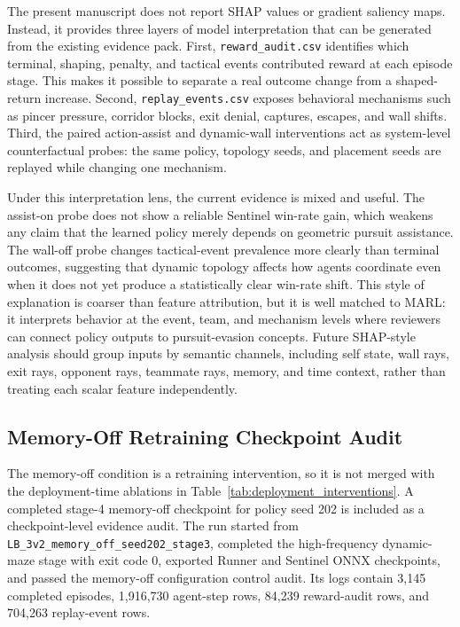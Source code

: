 \documentclass[journal]{IEEEtran}
\begin{document}
The present manuscript does not report SHAP values or gradient saliency maps.
Instead, it provides three layers of model interpretation that can be generated
from the existing evidence pack. First, \texttt{reward\_audit.csv} identifies
which terminal, shaping, penalty, and tactical events contributed reward at
each episode stage. This makes it possible to separate a real outcome change
from a shaped-return increase. Second, \texttt{replay\_events.csv} exposes
behavioral mechanisms such as pincer pressure, corridor blocks, exit denial,
captures, escapes, and wall shifts. Third, the paired action-assist and
dynamic-wall interventions act as system-level counterfactual probes: the same
policy, topology seeds, and placement seeds are replayed while changing one
mechanism.

Under this interpretation lens, the current evidence is mixed and useful. The
assist-on probe does not show a reliable Sentinel win-rate gain, which weakens
any claim that the learned policy merely depends on geometric pursuit
assistance. The wall-off probe changes tactical-event prevalence more clearly
than terminal outcomes, suggesting that dynamic topology affects how agents
coordinate even when it does not yet produce a statistically clear win-rate
shift. This style of explanation is coarser than feature attribution, but it is
well matched to MARL: it interprets behavior at the event, team, and mechanism
levels where reviewers can connect policy outputs to pursuit-evasion concepts.
Future SHAP-style analysis should group inputs by semantic channels, including
self state, wall rays, exit rays, opponent rays, teammate rays, memory, and time
context, rather than treating each scalar feature independently.

\subsection{Memory-Off Retraining Checkpoint Audit}

The memory-off condition is a retraining intervention, so it is not merged with
the deployment-time ablations in Table~\ref{tab:deployment_interventions}. A
completed stage-4 memory-off checkpoint for policy seed 202 is included as a
checkpoint-level evidence audit. The run started from
\texttt{LB\_3v2\_memory\_off\_seed202\_stage3}, completed the high-frequency
dynamic-maze stage with exit code 0, exported Runner and Sentinel ONNX
checkpoints, and passed the memory-off configuration control audit. Its logs
contain 3,145 completed episodes, 1,916,730 agent-step rows, 84,239 reward-audit
rows, and 704,263 replay-event rows.
\end{document}
